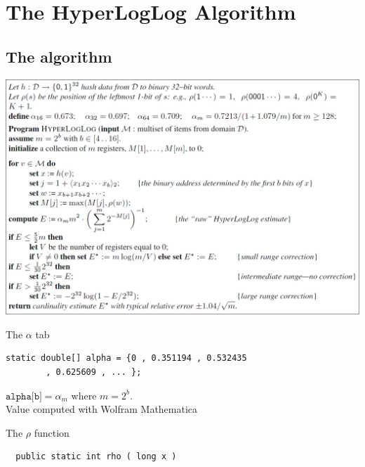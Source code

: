 \documentclass{beamer}
\begin{document}
\section{The HyperLogLog Algorithm}

\subsection{The algorithm}
\begin{frame}
\includegraphics[scale=0.3]{pictures/algoFlajolet.png}
\end{frame}

\begin{frame}[fragile]

\begin{block}{The $\alpha$ tab}
\begin{verbatim}
static double[] alpha = {0 , 0.351194 , 0.532435
        , 0.625609 , ... };
\end{verbatim}
$\texttt{alpha[b]} = \alpha_m$ where $m = 2^b$.\\
Value computed with Wolfram Mathematica
\end{block}

\begin{block}{The $\rho$ function}
\begin{verbatim}
  public static int rho ( long x )
\end{verbatim}

\end{block}
\end{frame}
\end{document}
